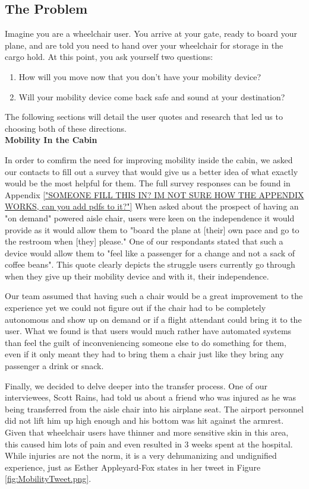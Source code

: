 \subsection{The Problem}

Imagine you are a wheelchair user. You arrive at your gate, ready to board your plane, and are told you need to hand over your wheelchair for storage in the cargo hold. At this point, you ask yourself two questions: 
\begin{enumerate}
	\item How will you move now that you don't have your mobility device? 
	\item Will your mobility device come back safe and sound at your destination?
\end{enumerate}
The following sections will detail the user quotes and research that led us to choosing both of these directions.  
\\

\textbf{Mobility In the Cabin}

In order to comfirm the need for improving mobility inside the cabin, we asked our contacts to fill out a survey that would give us a better idea of what exactly would be the most helpful for them. The full survey responses can be found in Appendix \ref{"SOMEONE FILL THIS IN? IM NOT SURE HOW THE APPENDIX WORKS, can you add pdfs to it?"} 
When asked about the prospect of having an "on demand"  powered aisle chair, users were keen on the independence it would provide as it would allow them to "board the plane at [their] own pace and go to the restroom when [they] please." One of our respondants stated that such a device would allow them to "feel like a passenger for a change and not a sack of coffee beans". This quote clearly depicts the struggle users currently go through when they give up their mobility device and with it, their independence.

Our team assumed that having such a chair would be a great improvement to the experience yet we could not figure out if the chair had to be completely autonomous and show up on demand or if a flight attendant could bring it to the user. What we found is that users would much rather have automated systems than feel the guilt of inconveniencing someone else to do something for them, even if it only meant they had to bring them a chair just like they bring any passenger a drink or snack. 

Finally, we decided to delve deeper into the transfer process. One of our interviewees, Scott Rains, had told us about a friend who was injured as he was being transferred from the aisle chair into his airplane seat. The airport personnel did not lift him up high enough and his bottom was hit against the armrest. Given that wheelchair users have thinner and more sensitive skin in this area, this caused him lots of pain and even resulted in 3 weeks spent at the hospital. While injuries are not the norm, it is a very dehumanizing and undignified experience, just as Esther Appleyard-Fox states in her tweet in Figure \ref{fig:MobilityTweet.png}. 


